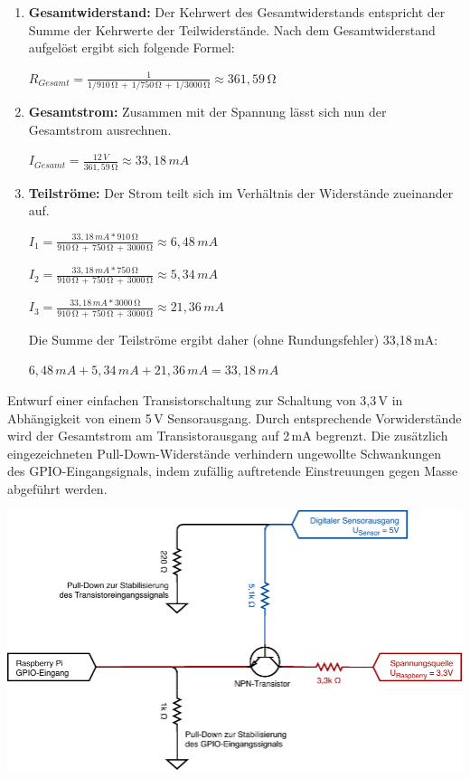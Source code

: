 \begin{enumerate}
    \item \textbf{Gesamtwiderstand:} Der Kehrwert des Gesamtwiderstands entspricht
    der Summe der Kehrwerte der Teilwiderstände. Nach dem Gesamtwiderstand aufgelöst
    ergibt sich folgende Formel:

    $R_{Gesamt} = \frac{1}{1/910\,\si{\ohm} \,+\, 1/750\,\si{\ohm} \,+\, 1/3000\,\si{\ohm}} \approx 361,59\,\si{\ohm}$

    \item \textbf{Gesamtstrom:} Zusammen mit der Spannung lässt sich nun der Gesamtstrom
    ausrechnen.

    $I_{Gesamt} = \frac{12\,V}{361,59\,\si{\ohm}} \approx 33,18\,mA$

    \item \textbf{Teilströme:} Der Strom teilt sich im Verhältnis der Widerstände
    zueinander auf.

    $I_1 = \frac{33,18\,mA * 910\,\si{\ohm}}{910\,\si{\ohm} \,+\, 750\,\si{\ohm} \,+\, 3000\,\si{\ohm}} \approx 6,48\,mA$

    $I_2 = \frac{33,18\,mA * 750\,\si{\ohm}}{910\,\si{\ohm} \,+\, 750\,\si{\ohm} \,+\, 3000\,\si{\ohm}} \approx 5,34\,mA$

    $I_3 = \frac{33,18\,mA * 3000\,\si{\ohm}}{910\,\si{\ohm} \,+\, 750\,\si{\ohm} \,+\, 3000\,\si{\ohm}} \approx 21,36\,mA$

    Die Summe der Teilströme ergibt daher (ohne Rundungsfehler) 33,18\,mA:

    $6,48\,mA + 5,34\,mA + 21,36\,mA = 33,18\,mA$
\end{enumerate}

\teilaufgabe
Entwurf einer einfachen Transistorschaltung zur Schaltung von 3,3\,V in
Abhängigkeit von einem 5\,V Sensorausgang. Durch entsprechende Vorwiderstände
wird der Gesamtstrom am Transistorausgang auf 2\,mA begrenzt. Die zusätzlich
eingezeichneten Pull-Down-Widerstände verhindern ungewollte Schwankungen des
GPIO-Eingangsignals, indem zufällig auftretende Einstreuungen gegen Masse
abgeführt werden.

\includegraphics[width=\textwidth]{2-hardwaredesign/img/transistor_sensor_schaltplan}

